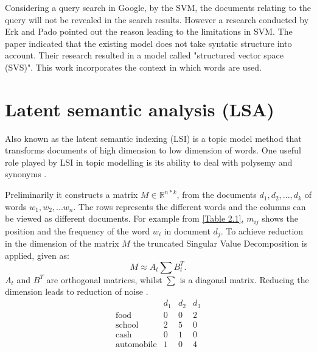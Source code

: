 Considering a query search in Google, by the SVM, the documents relating to the query will not be revealed in the search results. However a research conducted by Erk and Pado pointed out the reason leading to the limitations in SVM.
The paper indicated that the existing model does not take syntatic structure into account. Their research resulted in a model called "structured vector space (SVS)". This work incorporates the context in which words are used.
%

\section{Latent semantic analysis (LSA)}
\begin{flushleft}
Also known as the latent semantic indexing (LSI) is a topic model method
that transforms documents of high dimension to low dimension of words. One useful role played by LSI in topic modelling is its ability to deal with polysemy and synonyms \cite{deerwester1990indexing}.
\end{flushleft} 
Preliminarily it constructs a matrix $M\in \mathbb{R}^{n*k}$, from the documents $d_1, d_2,..., d_k$ of words $w_1, w_2, ... w_n$. The rows represents the different words and the columns can be viewed as different documents.
For example from \eqref{Table 2.1}, $m_{ij}$ shows the position and the frequency of the word $w_i$ in document $d_j$.
To achieve reduction in the dimension of the matrix $M$ the truncated Singular Value Decomposition is applied, given as:
$$M\approx A_t \sum B^{T}_t.$$
$A_t$ and $B^T$ are orthogonal matrices, whilst $ \sum$ is a diagonal matrix.
Reducing the dimension leads to reduction of noise \cite{deerwester1990indexing}.
$$\begin{array}{cccc}
 &d_1 & d_2 &d_3 \\ 
 \text{food} & 0 & 0 & 2 \\ 
 \text{school} & 2 & 5 & 0 \\ 
 \text{cash} & 0 & 1 & 0 \\ 
 \text{automobile} & 1 & 0 & 4
  \end{array} $$
